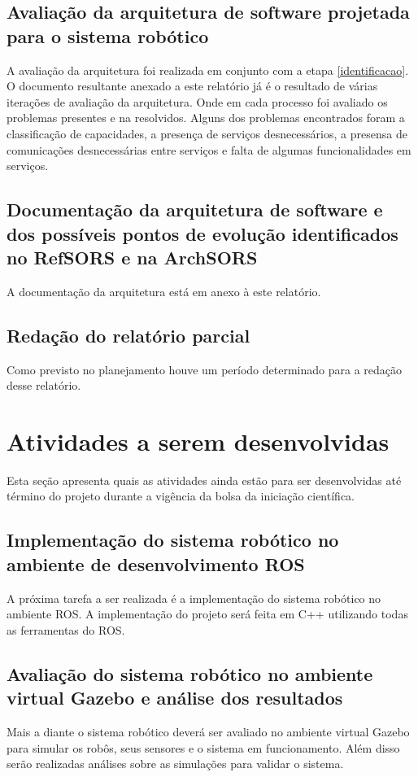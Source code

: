 \documentclass[12pt]{report}
\begin{document}
\section{Avaliação da arquitetura de software projetada para o sistema robótico}
A avaliação da arquitetura foi realizada em conjunto com a etapa \ref{identificacao}. O documento resultante anexado a este relatório já é o resultado de várias iterações de avaliação da arquitetura. Onde em cada processo foi avaliado os problemas presentes e na resolvidos. Alguns dos problemas encontrados foram a classificação de capacidades, a presença de serviços desnecessários, a presensa de comunicações desnecessárias entre serviços e falta de algumas funcionalidades em serviços.  

\section{Documentação da arquitetura de software e dos possíveis pontos de evolução identificados no RefSORS e na ArchSORS}
A documentação da arquitetura está em anexo à este relatório.

\section{Redação do relatório parcial}
Como previsto no planejamento houve um período determinado para a redação desse relatório.

\chapter{Atividades a serem desenvolvidas}
Esta seção apresenta quais as atividades ainda estão para ser desenvolvidas até término do projeto durante a vigência da bolsa da iniciação científica.

\section{Implementação do sistema robótico no ambiente de desenvolvimento ROS}\label{implementacao}
A próxima tarefa a ser realizada é a implementação do sistema robótico no ambiente ROS. A implementação do projeto será feita em C++ utilizando todas as ferramentas do ROS.

\section{Avaliação do sistema robótico no ambiente virtual Gazebo e análise dos resultados}
Mais a diante o sistema robótico deverá ser avaliado no ambiente virtual Gazebo para simular os robôs, seus sensores e o sistema em funcionamento. Além disso serão realizadas análises sobre as simulações para validar o sistema.
\end{document}

